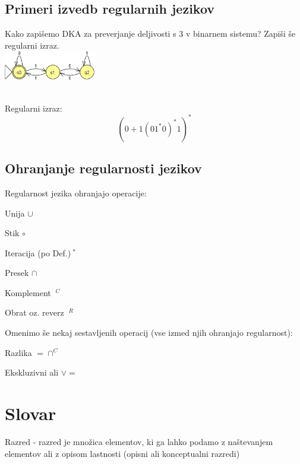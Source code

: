 \documentclass[10pt,a4paper,oneside]{book}
\begin{document}
\section{Primeri izvedb regularnih jezikov}%
\begin{primeri}
\item Kako zapišemo DKA za preverjanje deljivosti s 3 v binarnem sistemu? Zapiši še regularni izraz.
\ \\
\includegraphics[width=4cm]{./DKAdiv3}

\ \\
Regularni izraz:
\begin{displaymath}
(0+1(01^*0)^*1)^*
\end{displaymath}
\end{primeri}

\section{Ohranjanje regularnosti jezikov}
Regularnost jezika ohranjajo operacije:
\begin{items}
\item Unija $\cup$
\item Stik $\circ$
\item Iteracija (po Def.)$\ ^*$
\item Presek $\cap$
\item Komplement $\ ^C$ %
\item Obrat oz. reverz $\ ^R$
\end{items}
Omenimo še nekaj sestavljenih operacij (vse izmed njih ohranjajo regularnost):
\begin{items}
\item Razlika $=\cap^C$%
\item Ekskluzivni ali $\vee=$ %
\end{items}
	
\pagebreak

\chapter{Slovar}
\begin{items}
\item Razred - razred je množica elementov, ki ga lahko podamo z naštevanjem elementov ali z opisom lastnosti (opisni ali konceptualni razredi)
\end{items}
\end{document}
